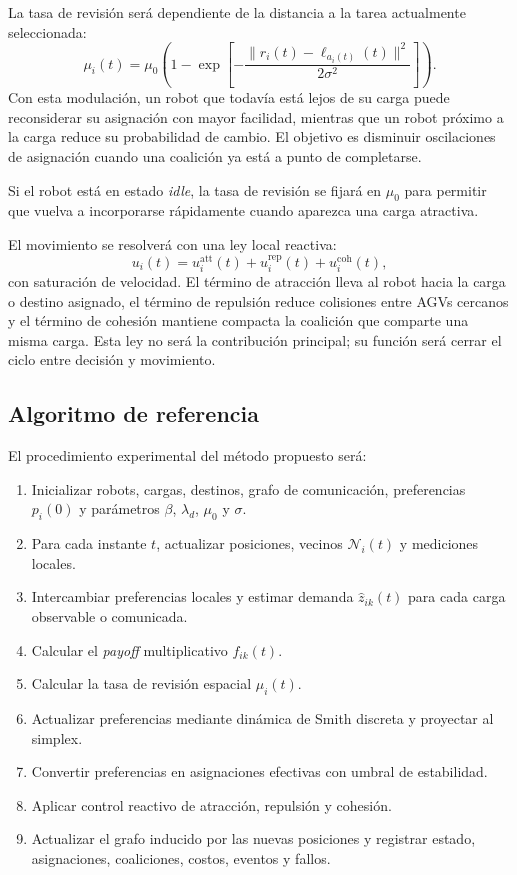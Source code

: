 \documentclass[11pt,a4paper]{article}
\begin{document}
La tasa de revisión será dependiente de la distancia a la tarea actualmente seleccionada:
\[
\mu_i(t)=\mu_0\left(1-\exp\left[-\frac{\|r_i(t)-\ell_{a_i(t)}(t)\|^2}{2\sigma^2}\right]\right).
\]
Con esta modulación, un robot que todavía está lejos de su carga puede reconsiderar su asignación con mayor facilidad, mientras que un robot próximo a la carga reduce su probabilidad de cambio. El objetivo es disminuir oscilaciones de asignación cuando una coalición ya está a punto de completarse.

Si el robot está en estado \textit{idle}, la tasa de revisión se fijará en $\mu_0$ para permitir que vuelva a incorporarse rápidamente cuando aparezca una carga atractiva.

El movimiento se resolverá con una ley local reactiva:
\[
u_i(t)=u_i^{\mathrm{att}}(t)+u_i^{\mathrm{rep}}(t)+u_i^{\mathrm{coh}}(t),
\]
con saturación de velocidad. El término de atracción lleva al robot hacia la carga o destino asignado, el término de repulsión reduce colisiones entre AGVs cercanos y el término de cohesión mantiene compacta la coalición que comparte una misma carga. Esta ley no será la contribución principal; su función será cerrar el ciclo entre decisión y movimiento.

\subsection{Algoritmo de referencia}

El procedimiento experimental del método propuesto será:

\begin{enumerate}
  \item Inicializar robots, cargas, destinos, grafo de comunicación, preferencias $p_i(0)$ y parámetros $\beta$, $\lambda_d$, $\mu_0$ y $\sigma$.
  \item Para cada instante $t$, actualizar posiciones, vecinos $\mathcal{N}_i(t)$ y mediciones locales.
  \item Intercambiar preferencias locales y estimar demanda $\hat{z}_{ik}(t)$ para cada carga observable o comunicada.
  \item Calcular el \textit{payoff} multiplicativo $f_{ik}(t)$.
  \item Calcular la tasa de revisión espacial $\mu_i(t)$.
  \item Actualizar preferencias mediante dinámica de Smith discreta y proyectar al simplex.
  \item Convertir preferencias en asignaciones efectivas con umbral de estabilidad.
  \item Aplicar control reactivo de atracción, repulsión y cohesión.
  \item Actualizar el grafo inducido por las nuevas posiciones y registrar estado, asignaciones, coaliciones, costos, eventos y fallos.
\end{enumerate}
\end{document}
